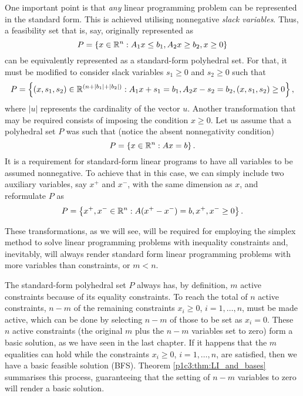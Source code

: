 One important point is that \emph{any} linear programming problem can be represented in the standard form. This is achieved utilising nonnegative \emph{slack variables}. Thus, a feasibility set that is, say, originally represented as
%
\begin{equation*}
	P = \left\{ x \in \mathbb{R}^n : A_1 x \le b_1, A_2x \ge b_2, x \ge 0 \right \}
\end{equation*}
%
can be equivalently represented as a standard-form polyhedral set. For that, it must be modified to consider slack variables $s_1 \ge 0$ and $s_2 \geq 0$ such that
%
\begin{equation*}
	P = \left\{ (x, s_1, s_2) \in \mathbb{R}^{(n + |b_1| + |b_2|)} : A_1 x + s_1 = b_1, A_2x - s_2 = b_2, (x, s_1, s_2) \ge 0 \right \},
\end{equation*}
%
where $|u|$ represents the cardinality of the vector $u$. Another transformation that may be required consists of imposing the condition $x \ge 0$. Let us assume that a polyhedral set $P$ was such that (notice the absent nonnegativity condition)
%
\begin{equation*}
	P = \left\{ x \in \mathbb{R}^n : Ax = b \right \}.		
\end{equation*}
%
It is a requirement for standard-form linear programs to have all variables to be assumed nonnegative. To achieve that in this case, we can simply include two auxiliary variables, say $x^+$ and $x^-$, with the same dimension as $x$, and reformulate $P$ as
\begin{equation*}
	P = \left\{ x^+,x^- \in \mathbb{R}^n : A(x^+ - x^-) = b, x^+, x^- \ge 0 \right \}.		
\end{equation*}
%

These transformations, as we will see, will be required for employing the simplex method to solve linear programming problems with inequality constraints and, inevitably, will always render standard form linear programming problems with more variables than constraints, or $m < n$.

The standard-form polyhedral set $P$ always has, by definition, $m$ active constraints because of its equality constraints. To reach the total of $n$ active constraints, $n-m$ of the remaining constraints $x_i \ge 0$, $i =1,\dots, n$, must be made active, which can be done by selecting $n-m$ of those to be set as $x_i = 0$. These $n$ active constraints (the original $m$ plus the $n-m$ variables set to zero) form a basic solution, as we have seen in the last chapter. If it happens that the $m$ equalities can hold while the constraints $x_i \ge 0$, $i =1,\dots, n$, are satisfied, then we have a basic feasible solution (BFS). Theorem \ref{p1c3:thm:LI_and_bases} summarises this process, guaranteeing that the setting of $n-m$ variables to zero will render a basic solution.

